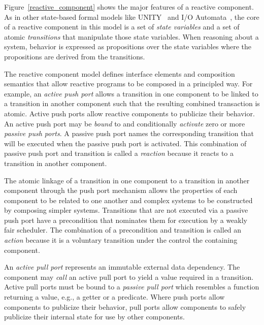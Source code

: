 Figure~\ref{reactive_component} shows the major features of a reactive component.
As in other state-based formal models like UNITY~\cite{chandy1989parallel} and I/O Automata~\cite{nancy1996distributed}, the core of a reactive component in this model is a set of \emph{state variables} and a set of atomic \emph{transitions} that manipulate those state variables.
When reasoning about a system, behavior is expressed as propositions over the state variables where the propositions are derived from the transitions.


The reactive component model defines interface elements and composition semantics that allow reactive programs to be composed in a principled way.
For example, an \emph{active push port} allows a transition in one component to be linked to a transition in another component such that the resulting combined transaction is atomic.
Active push ports allow reactive components to publicize their behavior.
An active push port may be \emph{bound} to and conditionally \emph{activate} zero or more \emph{passive push ports}.
A passive push port names the corresponding transition that will be executed when the passive push port is activated.
This combination of passive push port and transition is called a \emph{reaction} because it reacts to a transition in another component.

The atomic linkage of a transition in one component to a transition in another component through the push port mechanism allows the properties of each component to be related to one another and complex systems to be constructed by composing simpler systems.
Transitions that are not executed via a passive push port have a precondition that nominates them for execution by a weakly fair scheduler.
The combination of a precondition and transition is called an \emph{action} because it is a voluntary transition under the control the containing component.

An \emph{active pull port} represents an immutable external data dependency.
The component may \emph{call} an active pull port to yield a value required in a transition.
Active pull ports must be bound to a \emph{passive pull port} which resembles a function returning a value, e.g., a getter or a predicate.
Where push ports allow components to publicize their behavior, pull ports allow components to safely publicize their internal state for use by other components.

